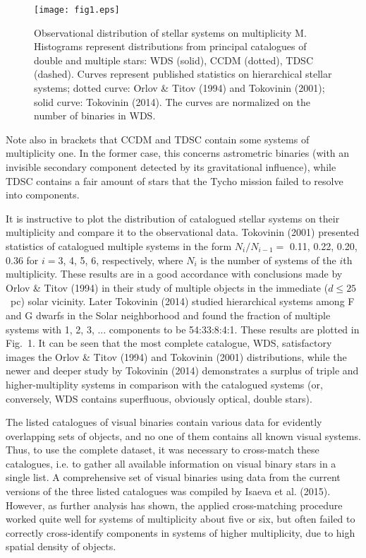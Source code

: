\documentclass[10pt,a4paper,twoside]{article}
\begin{document}
\begin{figure}
\texttt{[image: fig1.eps]}
\caption{Observational distribution of stellar systems on
multiplicity M. Histograms represent distributions from principal
catalogues of double and multiple stars: WDS (solid), CCDM
(dotted), TDSC (dashed). Curves represent published statistics on
hierarchical stellar systems; dotted curve: Orlov \& Titov (1994)
and Tokovinin (2001); solid curve: Tokovinin (2014). The curves
are normalized on the number of binaries in WDS.}
\label{fig:multiplicity}
\end{figure}

Note also in brackets that CCDM and TDSC contain some systems of
multiplicity one. In the former case, this concerns astrometric
binaries (with an invisible secondary component detected by its
gravitational influence), while TDSC contains a fair amount of
stars that the Tycho mission failed to resolve into components.

It is instructive to plot the distribution of catalogued stellar
systems on their multiplicity and compare it to the observational
data. Tokovinin (2001) presented statistics of catalogued multiple
systems in the form $N_i/N_{i-1}=$ 0.11, 0.22, 0.20, 0.36 for
$i=3$, 4, 5, 6, respectively, where $N_i$ is the number of systems
of the $i$th multiplicity. These results are in a good accordance
with conclusions made by Orlov \& Titov (1994) in their study of
multiple objects in the immediate ($d \le 25$~pc) solar vicinity.
Later Tokovinin (2014) studied hierarchical systems among F and G
dwarfs in the Solar neighborhood and found the fraction of
multiple systems with 1, 2, 3, ... components to be 54:33:8:4:1.
These results are plotted in Fig.~1. It can be seen that the most
complete catalogue, WDS, satisfactory images the Orlov \& Titov
(1994) and Tokovinin (2001) distributions, while the newer and
deeper study by Tokovinin (2014) demonstrates a surplus of triple
and higher-multiplity systems in comparison with the catalogued
systems (or, conversely, WDS contains superfluous, obviously
optical, double stars).

The listed catalogues of visual binaries contain various data for
evidently overlapping sets of objects, and no one of them contains
all known visual systems. Thus, to use the complete dataset, it
was necessary to cross-match these catalogues, i.e. to gather all
available information on visual binary stars in a single list. A
comprehensive set of visual binaries using data from the current
versions of the three listed catalogues was compiled by Isaeva et
al. (2015). However, as further analysis has shown, the applied
cross-matching procedure worked quite well for systems of
multiplicity about five or six, but often failed to correctly
cross-identify components in systems of higher multiplicity, due
to high spatial density of objects.
\end{document}
